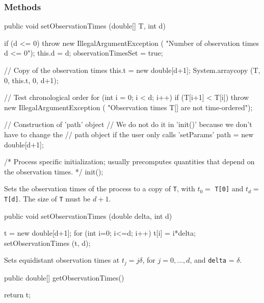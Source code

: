 \subsubsection* {Methods}
\begin{code}

   public void setObservationTimes (double[] T, int d)\begin{hide} {
        if (d <= 0) throw new IllegalArgumentException (
                    "Number of observation times d <= 0");
        this.d = d;
        observationTimesSet = true;

        // Copy of the observation times
        this.t = new double[d+1];
        System.arraycopy (T, 0, this.t, 0, d+1);

        // Test chronological order
        for (int i = 0; i < d; i++) {
            if (T[i+1] < T[i])
                throw new IllegalArgumentException (
                     "Observation times T[] are not time-ordered");
        }

        // Construction of 'path' object
        // We do not do it in 'init()' because we don't have to change the
        // path object if the user only calls 'setParams'
        path = new double[d+1];

        /* Process specific initialization; usually precomputes quantities
             that depend on the observation times.   */
        init();
    } \end{hide}
\end{code}
\begin{tabb}
Sets the observation times of the process to a copy of \texttt{T},
with $t_{0} =$ \texttt{T[0]} and $t_{d} =$ \texttt{T[d]}.
The size of \texttt{T} must be $d+1$.
\end{tabb}
\begin{code}

   public void setObservationTimes (double delta, int d)\begin{hide} {
        t = new double[d+1];
        for (int i=0; i<=d; i++) t[i] = i*delta;
        setObservationTimes (t, d);
    } \end{hide}
\end{code}
\begin{tabb} Sets equidistant observation times at $t_j = j\delta$, for $j=0,\dots,d$, and \texttt{delta} = $\delta$.
\end{tabb}
\begin{code}

   public double[] getObservationTimes() \begin{hide} {
        return t;
    }\end{hide}
\end{code}

